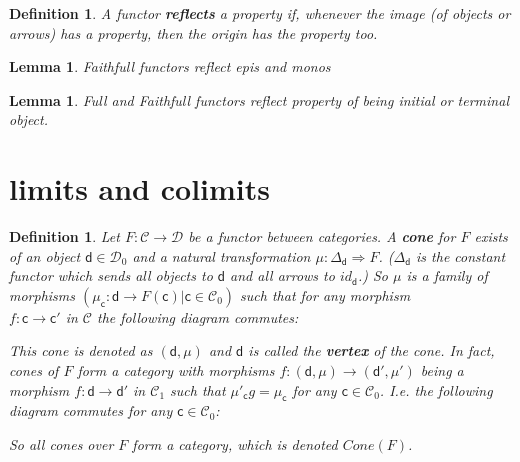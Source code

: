\documentclass{article}
\newcommand{\cat}[1]{\mathcal{#1}} %
\newcommand{\cato}[1]{\cat{#1}_0} %
\newcommand{\catm}[1]{\cat{#1}_1} %
\newcommand{\ob}[1]{\mathsf{#1}} %
\newtheorem{lemma}[theorem]{Lemma}
\newtheorem{definition}[theorem]{Definition}
\begin{document}
\begin{definition}
	A functor \textbf{reflects} a property if, whenever the image (of objects or arrows) has a property, then the origin has the property too.
\end{definition}

\begin{lemma}
	Faithfull functors reflect epis and monos
\end{lemma}

\begin{lemma}
	Full and Faithfull functors reflect property of being initial or terminal object.
\end{lemma}




\section{limits and colimits}

\begin{definition}
	Let $F: \cat{C} \rightarrow \cat{D}$ be a functor between categories. A \textbf{cone} for $F$ exists of an object $\ob{d} \in \cato{D}$ and a natural transformation $\mu: \Delta_\ob{d} \Rightarrow F$.
	($\Delta_\ob{d}$ is the constant functor which sends all objects to $\ob{d}$ and all arrows to $id_{\ob{d}}$.)
	So $\mu$ is a family of morphisms $(\mu_\ob{c}: \ob{d} \rightarrow F(\ob{c})| \ob{c} \in \cato{C})$ such that for any morphism \\
	$f: \ob{c} \rightarrow \ob{c}'$ in $\cat{C}$ the following diagram commutes:
	This cone is denoted as $(\ob{d}, \mu)$ and $\ob{d}$ is called the \textbf{vertex} of the cone.
	In fact, cones of $F$ form a category with morphisms $f: (\ob{d}, \mu) \rightarrow (\ob{d}', \mu')$ being a morphism $f: \ob{d} \rightarrow \ob{d}'$ in $\catm{C}$ such that $\mu'_\ob{c}g = \mu_\ob{c}$
	for any $\ob{c} \in \cato{C}$. I.e. the following diagram commutes for any $\ob{c} \in \cato{C}$:
	So all cones over $F$ form a category, which is denoted $Cone(F)$.
\end{definition}
\end{document}
